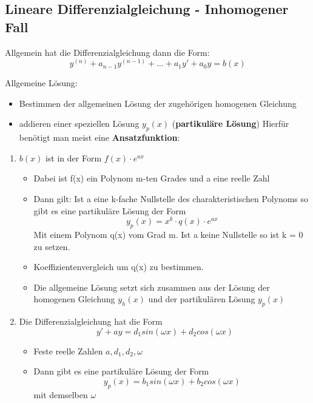\documentclass[german]{latex4ei/latex4ei_sheet}
\begin{document}
\begin{sectionbox}

    \subsection{Lineare Differenzialgleichung - Inhomogener Fall}
Allgemein hat die Differenzialgleichung dann die Form: 
$$ y^{(n)} + a_{n-1}y^{(n-1)}+ \dots + a_1y'+a_0 y = b(x) $$ 

Allgemeine Lösung: 
\begin{itemize}
    \item Bestimmen der allgemeinen Lösung der zugehörigen homogenen Gleichung
    \item addieren einer speziellen Lösung $y_p(x)$ (\textbf{partikuläre Lösung})
    Hierfür benötigt man meist eine \textbf{Ansatzfunktion}:
\end{itemize}

\begin{enumerate}
    \item $b(x)$ ist in der Form $f(x) \cdot e^{ax}$
    \begin{itemize}
        \item Dabei ist f(x) ein Polynom m-ten Grades und a eine reelle Zahl 
        \item Dann gilt: Ist a eine k-fache Nullstelle des charakteristischen Polynoms so gibt es eine partikuläre Lösung der Form $$ y_p(x) = x^k \cdot q(x) \cdot e^{ax}$$ Mit einem Polynom q(x) vom Grad m. Ist a keine Nullstelle so ist k = 0 zu setzen. 
        \item Koeffizientenvergleich um q(x) zu bestimmen. 
        \item Die allgemeine Lösung setzt sich zusammen aus der Lösung der homogenen Gleichung $y_h(x)$ und der partikulären Lösung $y_p(x)$

    \end{itemize}
    \item Die Differenzialgleichung hat die Form $$ y' + ay = d_1sin(\omega x) + d_2 cos(\omega x)$$ 
    \begin{itemize}
        \item Feste reelle Zahlen $a, d_1, d_2, \omega$
        \item Dann gibt es eine partikuläre Lösung der Form 
        $$ y_p(x)= b_1 sin(\omega x) + b_2 cos(\omega x) $$ mit demselben $\omega$
    \end{itemize}
    

\end{enumerate}
\end{sectionbox}
\end{document}

